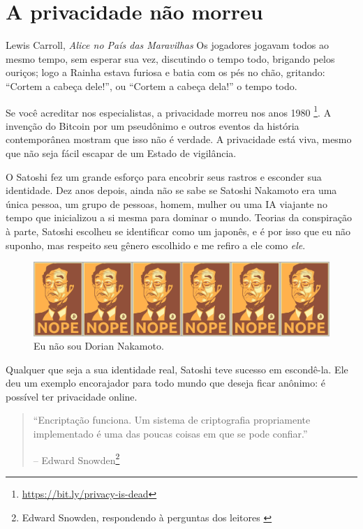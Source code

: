 \chapter{A privacidade não morreu}
\label{les:19}

\begin{chapquote}{Lewis Carroll, \textit{Alice no País das Maravilhas}}
	Os jogadores jogavam todos ao mesmo tempo, sem esperar sua vez, discutindo o tempo todo, brigando pelos ouriços; logo a Rainha estava furiosa e batia com os pés no chão, gritando: \enquote{Cortem a cabeça dele!}, ou \enquote{Cortem a cabeça dela!} o tempo todo.
\end{chapquote}

Se você acreditar nos especialistas, a privacidade morreu nos anos 1980
\footnote{\url{https://bit.ly/privacy-is-dead}}. A invenção do Bitcoin por um 
pseudônimo e outros eventos da história contemporânea mostram que isso não é verdade.
A privacidade está viva, mesmo que não seja fácil escapar de um Estado de vigilância. 

O Satoshi fez um grande esforço para encobrir seus rastros e esconder sua identidade. Dez anos depois, ainda não se sabe se Satoshi Nakamoto era uma única pessoa, um grupo de pessoas, homem, mulher ou uma IA viajante no tempo que inicializou a si mesma para dominar o mundo. Teorias da conspiração à parte, Satoshi escolheu se identificar como um japonês, e é por isso que eu não suponho, mas respeito seu gênero escolhido e me refiro a ele como \textit{ele}. 

\begin{figure}
  \includegraphics{assets/images/nope.png}
  \caption{Eu não sou Dorian Nakamoto.}
  \label{fig:nope}
\end{figure}

Qualquer que seja a sua identidade real, Satoshi teve sucesso em escondê-la. 
Ele deu um exemplo encorajador para todo mundo que deseja ficar anônimo: 
é possível ter privacidade online.

\begin{quotation}\begin{samepage}
\enquote{Encriptação funciona. Um sistema de criptografia propriamente implementado é uma das poucas coisas em que se pode confiar.}
\begin{flushright} -- Edward Snowden\footnote{Edward Snowden, respondendo à perguntas dos leitores \cite{snowden}}
\end{flushright}\end{samepage}\end{quotation}

